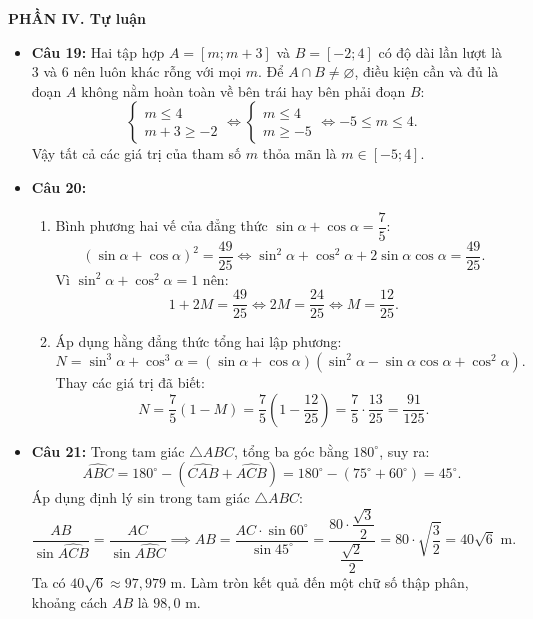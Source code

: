 \documentclass[12pt,a4paper]{article}
\begin{document}
\vspace{0.2cm}
\textbf{PHẦN IV. Tự luận}
\begin{itemize}[leftmargin=0.6cm, itemsep=4pt]
    \item \textbf{Câu 19:}
    Hai tập hợp $A = [m; m + 3]$ và $B = [-2; 4]$ có độ dài lần lượt là $3$ và $6$ nên luôn khác rỗng với mọi $m$.
    Để $A \cap B \ne \varnothing$, điều kiện cần và đủ là đoạn $A$ không nằm hoàn toàn về bên trái hay bên phải đoạn $B$:
    \[
    \begin{cases}
    m \le 4 \\
    m + 3 \ge -2
    \end{cases}
    \iff
    \begin{cases}
    m \le 4 \\
    m \ge -5
    \end{cases}
    \iff -5 \le m \le 4.
    \]
    Vậy tất cả các giá trị của tham số $m$ thỏa mãn là $m \in [-5; 4]$.

    \item \textbf{Câu 20:}
    \begin{enumerate}
        \item Bình phương hai vế của đẳng thức $\sin \alpha + \cos \alpha = \dfrac{7}{5}$:
        \[
        (\sin \alpha + \cos \alpha)^2 = \dfrac{49}{25} \iff \sin^2 \alpha + \cos^2 \alpha + 2\sin \alpha \cos \alpha = \dfrac{49}{25}.
        \]
        Vì $\sin^2 \alpha + \cos^2 \alpha = 1$ nên:
        \[
        1 + 2M = \dfrac{49}{25} \iff 2M = \dfrac{24}{25} \iff M = \dfrac{12}{25}.
        \]
        \item Áp dụng hằng đẳng thức tổng hai lập phương:
        \[
        N = \sin^3 \alpha + \cos^3 \alpha = (\sin \alpha + \cos \alpha)(\sin^2 \alpha - \sin \alpha \cos \alpha + \cos^2 \alpha).
        \]
        Thay các giá trị đã biết:
        \[
        N = \dfrac{7}{5} \left(1 - M\right) = \dfrac{7}{5} \left(1 - \dfrac{12}{25}\right) = \dfrac{7}{5} \cdot \dfrac{13}{25} = \dfrac{91}{125}.
        \]
    \end{enumerate}

    \item \textbf{Câu 21:}
    Trong tam giác $\triangle ABC$, tổng ba góc bằng $180^\circ$, suy ra:
    \[
    \widehat{ABC} = 180^\circ - (\widehat{CAB} + \widehat{ACB}) = 180^\circ - (75^\circ + 60^\circ) = 45^\circ.
    \]
    Áp dụng định lý sin trong tam giác $\triangle ABC$:
    \[
    \dfrac{AB}{\sin \widehat{ACB}} = \dfrac{AC}{\sin \widehat{ABC}} \implies AB = \dfrac{AC \cdot \sin 60^\circ}{\sin 45^\circ} = \dfrac{80 \cdot \dfrac{\sqrt{3}}{2}}{\dfrac{\sqrt{2}}{2}} = 80 \cdot \sqrt{\dfrac{3}{2}} = 40\sqrt{6}\text{ m}.
    \]
    Ta có $40\sqrt{6} \approx 97{,}979\text{ m}$. Làm tròn kết quả đến một chữ số thập phân, khoảng cách $AB$ là $98{,}0\text{ m}$.


\end{itemize}
\end{document}
